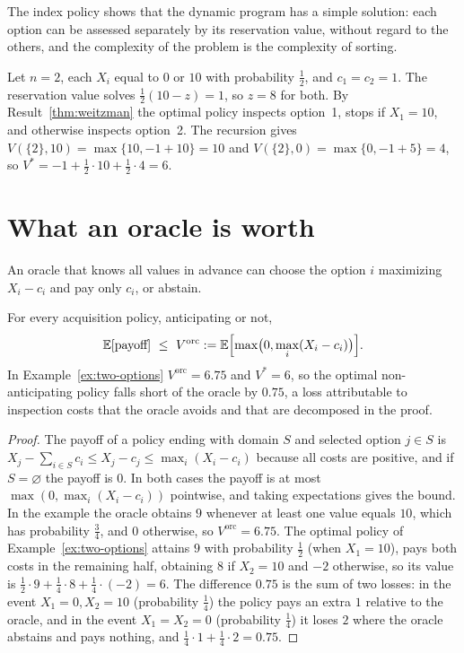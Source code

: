 The index policy shows that the dynamic program has a simple solution: each option can be assessed separately by its reservation value, without regard to the others, and the complexity of the problem is the complexity of sorting.

\begin{example}\label{ex:two-options}
Let $n=2$, each $X_i$ equal to $0$ or $10$ with probability $\frac12$, and $c_1=c_2=1$. The reservation value solves $\frac12(10-z)=1$, so $z=8$ for both. By Result~\ref{thm:weitzman} the optimal policy inspects option~1, stops if $X_1=10$, and otherwise inspects option~2. The recursion gives $V(\{2\},10)=\max\{10,-1+10\}=10$ and $V(\{2\},0)=\max\{0,-1+5\}=4$, so $V^{*}=-1+\frac12\cdot10+\frac12\cdot4=6$.
\end{example}

\section{What an oracle is worth}

An oracle that knows all values in advance can choose the option $i$ maximizing $X_i-c_i$ and pay only $c_i$, or abstain.

\begin{newresult}\label{prop:oracle}
For every acquisition policy, anticipating or not,
\[
\mathbb E[\text{payoff}]\ \le\ V^{\mathrm{orc}}:=\mathbb E\Bigl[\max\bigl(0,\max_{i}(X_i-c_i)\bigr)\Bigr].
\]
In Example~\ref{ex:two-options} $V^{\mathrm{orc}}=6.75$ and $V^{*}=6$, so the optimal non-anticipating policy falls short of the oracle by $0.75$, a loss attributable to inspection costs that the oracle avoids and that are decomposed in the proof.
\end{newresult}
\begin{proof}
The payoff of a policy ending with domain $S$ and selected option $j\in S$ is $X_j-\sum_{i\in S}c_i\le X_j-c_j\le\max_i(X_i-c_i)$ because all costs are positive, and if $S=\varnothing$ the payoff is $0$. In both cases the payoff is at most $\max(0,\max_i(X_i-c_i))$ pointwise, and taking expectations gives the bound. In the example the oracle obtains $9$ whenever at least one value equals $10$, which has probability $\frac34$, and $0$ otherwise, so $V^{\mathrm{orc}}=6.75$. The optimal policy of Example~\ref{ex:two-options} attains $9$ with probability $\frac12$ (when $X_1=10$), pays both costs in the remaining half, obtaining $8$ if $X_2=10$ and $-2$ otherwise, so its value is $\frac12\cdot9+\frac14\cdot8+\frac14\cdot(-2)=6$. The difference $0.75$ is the sum of two losses: in the event $X_1=0,X_2=10$ (probability $\frac14$) the policy pays an extra $1$ relative to the oracle, and in the event $X_1=X_2=0$ (probability $\frac14$) it loses $2$ where the oracle abstains and pays nothing, and $\frac14\cdot1+\frac14\cdot2=0.75$.
\end{proof}

